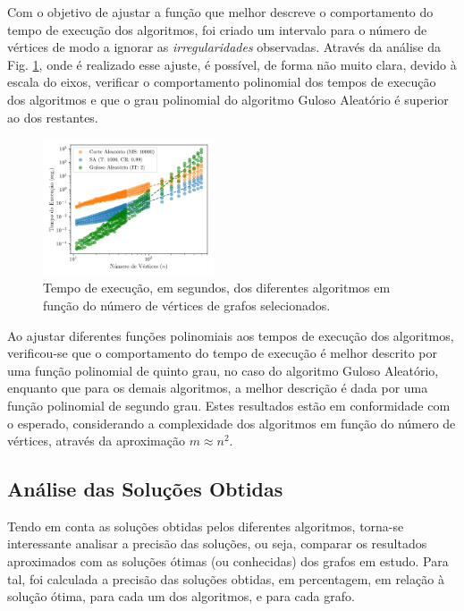 \documentclass[mirror, portugues]{revdetua}
\begin{document}
Com o objetivo de ajustar a função que melhor descreve o comportamento do tempo de execução dos algoritmos, foi criado um intervalo para o número de vértices de modo a ignorar as \textit{irregularidades} observadas. Através da análise da Fig. \ref{fig:time_interval}, onde é realizado esse ajuste, é possível, de forma não muito clara, devido à escala do eixos, verificar o comportamento polinomial dos tempos de execução dos algoritmos e que o grau polinomial do algoritmo Guloso Aleatório é superior ao dos restantes.

\begin{figure}[H]
    \centering
    \includegraphics[width=0.45\textwidth]{../assets/time_interval.png}
    \caption{Tempo de execução, em segundos, dos diferentes algoritmos em função do número de vértices de grafos selecionados.}
    \label{fig:time_interval}
\end{figure}

Ao ajustar diferentes funções polinomiais aos tempos de execução dos algoritmos, verificou-se que o comportamento do tempo de execução é melhor descrito por uma função polinomial de quinto grau, no caso do algoritmo Guloso Aleatório, enquanto que para os demais algoritmos, a melhor descrição é dada por uma função polinomial de segundo grau. Estes resultados estão em conformidade com o esperado, considerando a complexidade dos algoritmos em função do número de vértices, através da aproximação $m \approx n^2$.


\subsection{Análise das Soluções Obtidas}

Tendo em conta as soluções obtidas pelos diferentes algoritmos, torna-se interessante analisar a precisão das soluções, ou seja, comparar os resultados aproximados com as soluções ótimas (ou conhecidas) dos grafos em estudo. Para tal, foi calculada a precisão das soluções obtidas, em percentagem, em relação à solução ótima, para cada um dos algoritmos, e para cada grafo.
\end{document}
